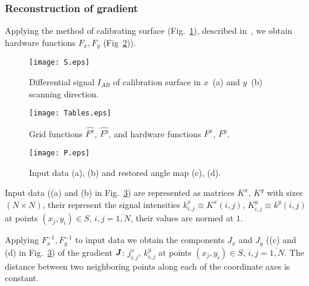 \documentclass{beamer}
\begin{document}
\begin{frame}[c,allowframebreaks]
    \frametitle{Reconstruction of gradient}

    Applying the method of calibrating surface (Fig.~\ref{fig:inputSphere}), described in~\cite{main},
    we obtain hardware functions $F_x, F_y$ (Fig~\ref{fig:Tables})).

    \begin{figure}[hp]
        \texttt{[image: S.eps]}
        \caption{\small Differential signal $I_{AB}$ of calibration surface in $x$~(a) and $y$~(b)
        scanning direction.}
        {\label{fig:inputSphere}}%
    \end{figure}

    \framebreak

    \begin{figure}
        \texttt{[image: Tables.eps]}
        \caption{Grid functions $\hat{F^x}$, $\hat{F^y}$, and hardware functions $F^x$, $F^y$.}
        {\label{fig:Tables}}%
    \end{figure}

    \framebreak

    \begin{figure}
        \texttt{[image: P.eps]}
        \caption{Input data (a), (b) and restored angle map (c), (d).}
        {\label{fig:input_data}}%
    \end{figure}

    Input data ((a) and (b) in Fig.~\ref{fig:input_data}) are represented as matrices $K^x$, $K^y$
    with sizes $(N \times N)$, their represent the signal intensities $k^x_{i,j} \equiv K^x (i,j)$,
    $K^y_{i,j} \equiv k^y (i,j)$ at points $(x_j, y_i) \in S$, $i,j = \overline{1,N}$, their values
    are normed at $1$.

    Applying $F_x^{-1}, F_y^{-1}$ to input data we obtain the components $J_x$ and $J_y$
    ((c) and (d) in Fig.~\ref{fig:input_data}) of the gradient ${\textbf{\emph{J}}}$: $j^x_{i,j}$,
    $k^y_{i,j}$ at points $(x_j, y_i) \in S$, $i,j = \overline{1,N}$. The distance between two
    neighboring points along each of the coordinate axes is constant.

\end{frame}
\end{document}
